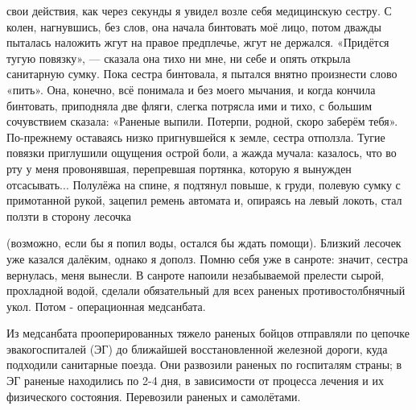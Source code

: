 \label{11-1}
свои действия, как через секунды я увидел возле себя медицинскую сестру. С колен, нагнувшись, без слов, она начала бинтовать моё лицо, потом дважды пыталась наложить жгут на правое предплечье, жгут не держался. «Придётся тугую повязку», — сказала она тихо ни мне, ни себе и опять открыла санитарную сумку. Пока сестра бинтовала, я пытался внятно произнести слово «пить». Она, конечно, всё понимала и без моего мычания, и когда кончила бинтовать, приподняла две фляги, слегка потрясла ими и тихо, с большим сочувствием сказала: «Раненые выпили. Потерпи, родной, скоро заберём тебя». По-прежнему оставаясь низко пригнувшейся к земле, сестра отползла. Тугие повязки приглушили ощущения острой боли, а жажда мучала: казалось, что во рту у меня провонявшая, перепревшая портянка, которую я вынужден отсасывать... Полулёжа на спине, я подтянул повыше, к груди, полевую сумку с примотанной рукой, зацепил ремень автомата и, опираясь на левый локоть, стал ползти в сторону лесочка

\label{12-1}
 (возможно, если бы я попил воды, остался бы ждать помощи). Близкий лесочек уже казался далёким, однако я дополз. Помню себя уже в санроте\footnotemark: значит, сестра вернулась, меня вынесли. В санроте напоили незабываемой прелести сырой, прохладной водой, сделали обязательный для всех раненых противостолбнячный укол. Потом - операционная медсанбата.

\label{12-2}

\label{12-3}

Из медсанбата прооперированных тяжело раненых бойцов отправляли по цепочке эвакогоспиталей (ЭГ) до ближайшей восстановленной железной дороги, куда подходили санитарные поезда. Они развозили раненых по госпиталям страны; в ЭГ раненые находились по 2-4 дня, в зависимости от процесса лечения и их физического состояния. Перевозили раненых и самолётами.

